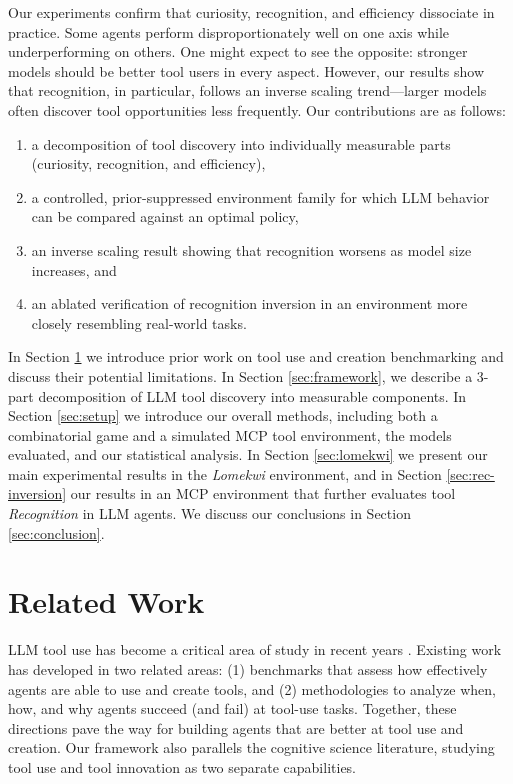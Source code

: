 \documentclass{article}
\begin{document}
Our experiments confirm that curiosity, recognition, and efficiency dissociate in practice. Some agents perform disproportionately well on one axis while underperforming on others. One might expect to see the opposite: stronger models should be better tool users in every aspect. However, our results show that recognition, in particular, follows an inverse scaling trend---larger models often discover tool opportunities less frequently. Our contributions are as follows:
\begin{enumerate}
\item a decomposition of tool discovery into individually measurable parts (curiosity, recognition, and efficiency),
\item a controlled, prior-suppressed environment family for which LLM behavior can be compared against an optimal policy,
\item an inverse scaling result showing that recognition worsens as model size increases, and
\item an ablated verification of recognition inversion in an environment more closely resembling real-world tasks.
\end{enumerate}

In Section \ref{sec:related} we introduce prior work on tool use and creation benchmarking and discuss their potential limitations. In Section \ref{sec:framework}, we describe a 3-part decomposition of LLM tool discovery into measurable components. In Section \ref{sec:setup} we introduce our overall methods, including both a combinatorial game and a simulated MCP tool environment, the models evaluated, and our statistical analysis. In Section \ref{sec:lomekwi} we present our main experimental results in the \textit{Lomekwi} environment, and in Section \ref{sec:rec-inversion} our results in an MCP environment that further evaluates tool \textit{Recognition} in LLM agents. We discuss our conclusions in Section \ref{sec:conclusion}.

\section{Related Work}
\label{sec:related}
LLM tool use has become a critical area of study in recent years \citep{qu2025toollearningsurvey}. Existing work has developed in two related areas: (1) benchmarks that assess how effectively agents are able to use and create tools, and (2) methodologies to analyze when, how, and why agents succeed (and fail) at tool-use tasks. Together, these directions pave the way for building agents that are better at tool use and creation. Our framework also parallels the cognitive science literature, studying tool use and tool innovation as two separate capabilities.
\end{document}
